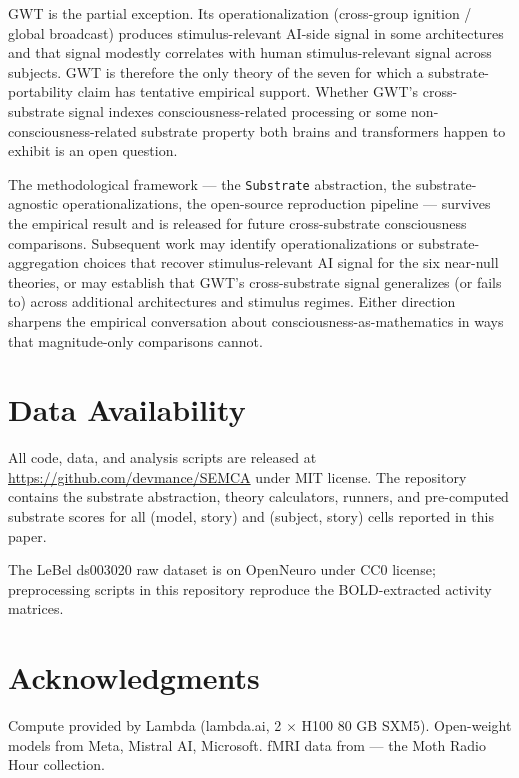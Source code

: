 \documentclass[11pt,a4paper]{article}
\begin{document}
GWT is the partial exception. Its operationalization (cross-group ignition / global broadcast) produces stimulus-relevant AI-side signal in some architectures and that signal modestly correlates with human stimulus-relevant signal across subjects. GWT is therefore the only theory of the seven for which a substrate-portability claim has tentative empirical support. Whether GWT's cross-substrate signal indexes consciousness-related processing or some non-consciousness-related substrate property both brains and transformers happen to exhibit is an open question.

The methodological framework --- the \texttt{Substrate} abstraction, the substrate-agnostic operationalizations, the open-source reproduction pipeline --- survives the empirical result and is released for future cross-substrate consciousness comparisons. Subsequent work may identify operationalizations or substrate-aggregation choices that recover stimulus-relevant AI signal for the six near-null theories, or may establish that GWT's cross-substrate signal generalizes (or fails to) across additional architectures and stimulus regimes. Either direction sharpens the empirical conversation about consciousness-as-mathematics in ways that magnitude-only comparisons cannot.

\section*{Data Availability}

All code, data, and analysis scripts are released at \url{https://github.com/devmance/SEMCA} under MIT license. The repository contains the substrate abstraction, theory calculators, runners, and pre-computed substrate scores for all (model, story) and (subject, story) cells reported in this paper.

The LeBel ds003020 raw dataset is on OpenNeuro under CC0 license; preprocessing scripts in this repository reproduce the BOLD-extracted activity matrices.

\section*{Acknowledgments}

Compute provided by Lambda (lambda.ai, 2 $\times$ H100 80 GB SXM5). Open-weight models from Meta, Mistral AI, Microsoft. fMRI data from \citet{lebel2023natural} --- the Moth Radio Hour collection.

\clearpage
\clearpage


\end{document}
